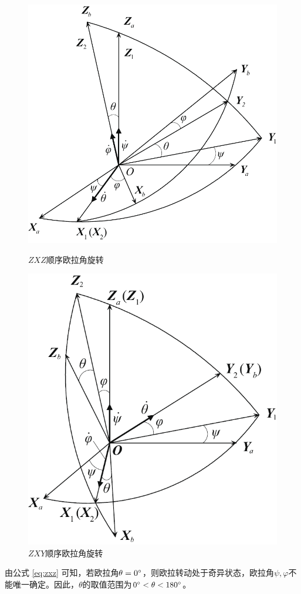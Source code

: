 \begin{figure}[!htb]
	\begin{minipage}{0.5\linewidth}
		\centering
		\includegraphics[width=0.8\linewidth]{pic/ZXZ}
		\caption{$ZXZ$顺序欧拉角旋转}
		\label{ZXZ}
	\end{minipage}
	\begin{minipage}{0.5\linewidth}
		\centering
		\includegraphics[width=0.695\linewidth]{pic/ZXY}
		\caption{$ZXY$顺序欧拉角旋转}
		\label{ZXY}
	\end{minipage}
\end{figure}
由公式 \eqref{eq:zxz} 可知，若欧拉角$\theta = 0{}^{\circ}$，则欧拉转动处于奇异状态，欧拉角$\psi, \varphi$不能唯一确定。因此，$\theta$的取值范围为$0{}^{\circ}<\theta<180{}^{\circ}$。
\vspace*{1em}

